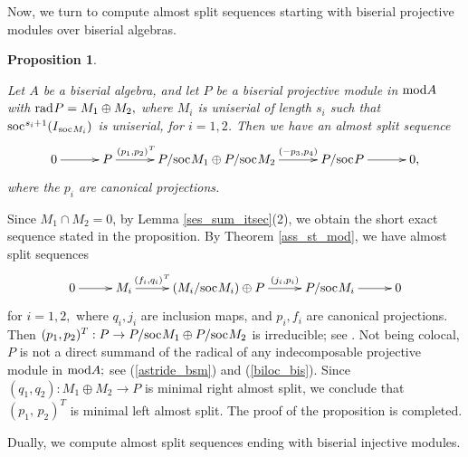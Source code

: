 \documentclass[10pt]{amsart}
\newtheorem{Prop}[Theo]{Proposition}
\theoremstyle{definition}
\newcommand{\mmod}{{\rm mod}}
\newcommand{\rad}{{\rm rad}\hspace{.5pt}}
\newcommand{\soc}{{\rm soc}\hspace{.5pt}}
\newcommand{\hp}{\hspace{.5pt}}
\newcommand{\vp}{\vspace{.5pt}}
\begin{document}
\smallskip

Now, we turn to compute almost split sequences starting with biserial projective mo\-dules over biserial algebras.

\begin{Prop}\label{ass_p_astride}

Let $A$ be a biserial algebra, and let $P$ be a biserial projective module in $\mmod A$ with $\rad P=M_1\oplus M_2,$ where $M_i$ is uniserial of length $s_i$ such that $\soc^{s_i+1}(I_{\hspace{.5pt}\soc M_i})$ is uniserial, for $i=1, 2$. Then we have an almost split sequence \vspace{-6pt}
$$\xymatrixcolsep{30pt}\xymatrix{0\ar[r] & P \ar[r]^-{(p_1, p_2)^{\hp T}\hspace{-2pt}}& P /\soc M_1 \oplus P/\soc M_2  \ar[r]^-{(-p_3, p_4)} &  P/\soc P \ar[r] & 0,}\vspace{-4.5pt}$$ where the $p_i$ are canonical projections.

\end{Prop}

\vspace{-1.5pt}

 Since $M_1\cap M_2=0$, by Lemma \ref{ses_sum_itsec}(2), we obtain the short exact sequence stated in the proposition. 
By Theorem \ref{ass_st_mod}, we have almost split sequences \vspace{-6pt}
$$\xymatrixcolsep{26pt}\xymatrix{0\ar[r] & M_i\ar[r]^-{(f_i, q_i)^{\hp T}} & (M_i/\soc M_i) \oplus P  \ar[r]^-{(j_i, p_i)} & P/\soc M_i \ar[r] & 0}\vspace{-5pt}$$ for $i=1, 2,$ where $q_i, j_i$ are inclusion maps, and $p_i, f_i$ are canonical projections. Then $(p_1,p_2)^T: P\to P/\soc M_1 \oplus P/\soc M_2$ is irreducible; see \cite[(1.3)]{LiY}. Not being colocal, $P$ is not a direct summand of the radical of any indecomposable projective module in $\mmod A;$ see (\ref{astride_bsm}) and (\ref{biloc_bis}). \vp Since $(q_1, q_2): M_1\oplus M_2\to P$ is minimal right almost split, we conclude that $(p_1, \,p_2)^T$ is minimal left almost split. The proof of the proposition is completed.

\smallskip

Dually,  we compute almost split sequences ending with biserial injective modules.
\end{document}
